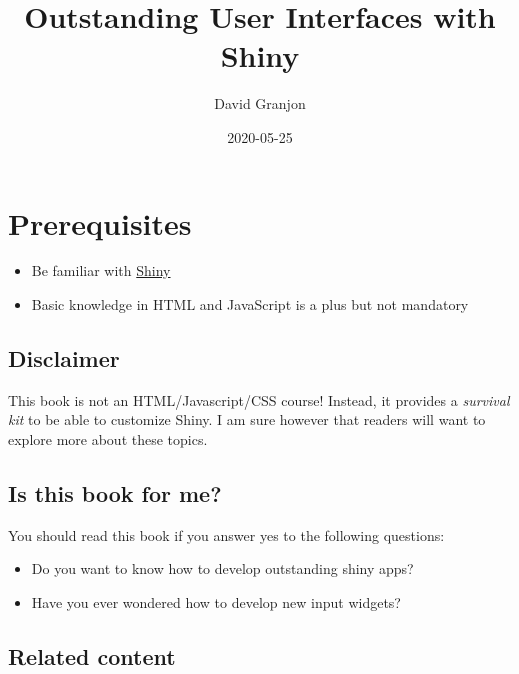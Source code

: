 \documentclass[]{book}
\title{Outstanding User Interfaces with Shiny}
\author{David Granjon}
\date{2020-05-25}
\providecommand{\tightlist}{%
  \setlength{\itemsep}{0pt}\setlength{\parskip}{0pt}}
\begin{document}
\maketitle

{
\setcounter{tocdepth}{1}
\tableofcontents
}
\hypertarget{prerequisites}{%
\chapter*{Prerequisites}\label{prerequisites}}

\begin{itemize}
\tightlist
\item
  Be familiar with \href{https://mastering-shiny.org}{Shiny}
\item
  Basic knowledge in HTML and JavaScript is a plus but not mandatory
\end{itemize}

\hypertarget{disclaimer}{%
\section*{Disclaimer}\label{disclaimer}}

This book is not an HTML/Javascript/CSS course! Instead, it provides a \emph{survival kit} to be able to customize Shiny. I am sure however that readers will want to explore more about these topics.

\hypertarget{is-this-book-for-me}{%
\section*{Is this book for me?}\label{is-this-book-for-me}}

You should read this book if you answer yes to the following questions:

\begin{itemize}
\tightlist
\item
  Do you want to know how to develop outstanding shiny apps?
\item
  Have you ever wondered how to develop new input widgets?
\end{itemize}

\hypertarget{related-content}{%
\section*{Related content}\label{related-content}}
\end{document}
